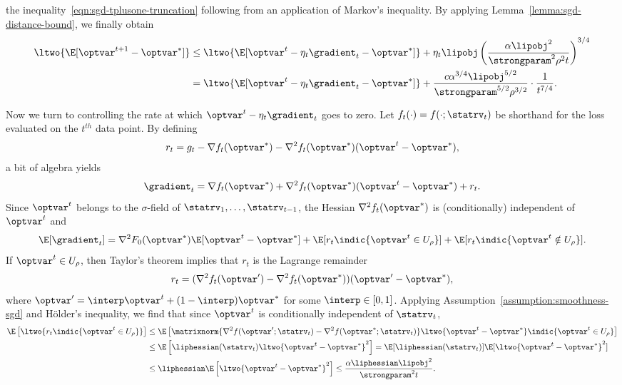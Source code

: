 \documentclass[11pt,twoside]{article}
\theoremstyle{definition}
\begin{document}
the inequality~\eqref{eqn:sgd-tplusone-truncation} following from an
application of Markov's inequality. By applying
Lemma~\ref{lemma:sgd-distance-bound}, we finally obtain
\begin{align}
  \ltwo{\E[\optvar^{t + 1} - \optvar^*]}
  & \le \ltwo{\E[\optvar^t - \eta_t \gradient_t - \optvar^*]}
  + \eta_t \lipobj \left(\frac{\alpha \lipobj^2}{\strongparam^2
    \rho^2 t}\right)^{3/4}
  \nonumber \\
  & = \ltwo{\E[\optvar^t - \eta_t \gradient_t - \optvar^*]}
  + \frac{c \alpha^{3/4} \lipobj^{5/2}}{
    \strongparam^{5/2} \rho^{3/2}}
  \cdot \frac{1}{t^{7/4}}.
  \label{eqn:sgd-t-plus-one-mean-square}
\end{align}

Now we turn to controlling the rate at which $\optvar^t - \eta_t
\gradient_t$ goes to zero. Let $f_t(\cdot) = f(\cdot; \statrv_t)$ be
shorthand for the loss evaluated on the $t^{th}$ data point. By
defining
\begin{align*}
r_t = g_t - \nabla f_t(\optvar^*) - \nabla^2
  f_t(\optvar^*)(\optvar^t - \optvar^*),
\end{align*} 
a bit of algebra yields
\begin{equation*}
  \gradient_t = \nabla f_t(\optvar^*)
  + \nabla^2 f_t(\optvar^*)(\optvar^t-\optvar^*) + r_t.
\end{equation*}
Since $\optvar^t$ belongs to the $\sigma$-field of $\statrv_1, \ldots,
\statrv_{t-1}$, the Hessian $\nabla^2 f_t(\optvar^*)$ is (conditionally)
independent of $\optvar^t$ and
\begin{equation}
  \label{eqn:sgd-truncate-grad}
  \E[\gradient_t] =
  \nabla^2 F_0(\optvar^*)\E[\optvar^t-\optvar^*]
  + \E[r_t \indic{\optvar^t\in U_\rho}] +
  \E[r_t\indic{\optvar^t\notin U_\rho}].
\end{equation}
If $\optvar^t\in U_\rho$, then Taylor's theorem implies that $r_t$ is the
Lagrange remainder
\begin{align*}
  r_t = (\nabla^2 f_t(\optvar') - \nabla^2 f_t(\optvar^*))(\optvar'-\optvar^*),
\end{align*}
where $\optvar'= \interp\optvar^t +(1-\interp)\optvar^*$ for
some $\interp \in [0, 1]$.
Applying Assumption~\ref{assumption:smoothness-sgd} and
H\"older's inequality, we find that
since $\optvar^t$ is conditionally independent of $\statrv_t$,
\begin{align*}
  \E\left[\ltwo{r_t \indic{\optvar^t \in U_\rho}}\right]
  & \le \E\left[
    \matrixnorm{\nabla^2 f(\optvar'; \statrv_t)
      - \nabla^2 f(\optvar^*; \statrv_t)}
    \ltwo{\optvar^t - \optvar^*}
    \indic{\optvar^t \in U_\rho}\right] \\
  & \le \E\left[\liphessian(\statrv_t) \ltwo{\optvar^t - \optvar^*}^2\right]
  = \E[\liphessian(\statrv_t)] \E[\ltwo{\optvar^t - \optvar^*}^2] \\
  & \le \liphessian \E\left[\ltwo{\optvar^t - \optvar^*}^2\right]
  \le \frac{\alpha \liphessian \lipobj^2}{\strongparam^2 t}.
\end{align*}
\end{document}
